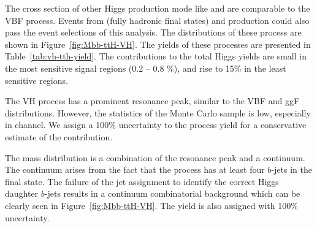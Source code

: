 The cross section of other Higgs production mode like \VH and \ttH are comparable to
the VBF process. Events from \VH (fully hadronic final states) and \ttH production could 
also pass the event selections of this analysis. The \Mbb distributions of these process
 are shown in Figure~\ref{fig:Mbb-ttH-VH}. The yields of these processes are presented 
in Table~\ref{tab:vh-tth-yield}.  The contributions to the total Higgs yields are  small 
in the most sensitive signal regions (0.2 -- 0.8 \%),  and rise to 15\% in the least sensitive regions.  

The VH process has a prominent resonance peak, similar to the VBF and ggF distributions. However, 
the statistics of the Monte Carlo sample is low, especially in \twocentral channel. 
We assign a 100\% uncertainty to the \VH process yield for a conservative estimate of 
the \VH contribution. %

The \ttH mass distribution is a combination of the resonance peak and a continuum. 
The continuum arises from the fact that the \ttH process has at least four $b$-jets in the final state.
The failure of the jet assignment to identify the correct Higgs daughter $b$-jets results in a 
continuum combinatorial background which can be clearly seen in Figure~\ref{fig:Mbb-ttH-VH}. 
The yield is also assigned with 100\% uncertainty.


